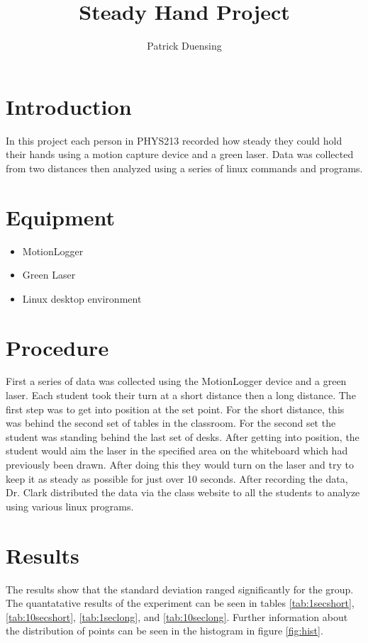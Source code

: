 \documentclass[10pt,letterpaper]{article}
\author{Patrick Duensing}
\title{Steady Hand Project}
\begin{document}
\maketitle
\section{Introduction}
	In this project each person in PHYS213 recorded how steady they could hold their hands using a motion capture device and a green laser. Data was collected from two distances then analyzed using a series of linux commands and programs.
\section{Equipment}
\begin{itemize}
\item MotionLogger
\item Green Laser
\item Linux desktop environment
\end{itemize}
\section{Procedure}
	First a series of data was collected using the MotionLogger device and a green laser. Each student took their turn at a short distance then a long distance. The first step was to get into position at the set point. For the short distance, this was behind the second set of tables in the classroom. For the second set the student was standing behind the last set of desks. After getting into position, the student would aim the laser in the specified area on the whiteboard which had previously been drawn. After doing this they would turn on the laser and try to keep it as steady as possible for just over 10 seconds. After recording the data, Dr. Clark distributed the data via the class website to all the students to analyze using various linux programs.
\section{Results}
	The results show that the standard deviation ranged significantly for the group. The quantatative results of the experiment can be seen in tables \ref{tab:1secshort}, \ref{tab:10secshort}, \ref{tab:1seclong}, and \ref{tab:10seclong}. Further information about the distribution of points can be seen in the histogram in figure \ref{fig:hist}.
\end{document}
